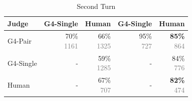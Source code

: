 \begin{table}[h]
\begin{subtable}[t]{0.48\textwidth}
{\begin{tabular}[t]{lrrrr}
Judge & G4-Single & Human & G4-Single & Human \\
\midrule

G4-Pair & \shortstack{70\% \\ \textcolor{gray}{ 1161 }} & \shortstack{66\% \\ \textcolor{gray}{ 1325 }} &  \shortstack{95\% \\ \textcolor{gray}{ 727 }} & \shortstack{\textbf{85\%} \\ \textcolor{gray}{ 864 }} \\
 \midrule
G4-Single & - & \shortstack{59\% \\ \textcolor{gray}{ 1285 }} & - & \shortstack{84\% \\ \textcolor{gray}{ 776 }} \\
 \midrule
Human & - & \shortstack{67\% \\ \textcolor{gray}{ 707 }} & - & \shortstack{\textbf{82\%} \\ \textcolor{gray}{ 474 }} \\
 \midrule
\end{tabular}
}
\caption{Second Turn}
\label{table:table:agreement_mt_bench_first_turn}
\end{subtable}
\vspace{-0em}
\label{table:agreement_mt_bench}
\end{table}












